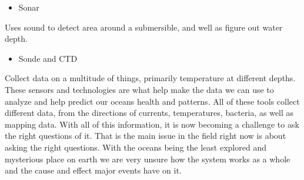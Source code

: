 \documentclass[sigconf]{acmart}
\begin{document}
\begin{itemize}
\item Sonar
\end{itemize}
Uses sound to detect area around a submersible, and well as figure out water depth.
\begin{itemize}
\item Sonde and CTD
\end{itemize}
Collect data on a multitude of things, primarily temperature at different depths.
These sensors and technologies are what help make the data we can use to analyze and help predict our oceans health and patterns.  All of these tools collect different data, from the directions of currents, temperatures, bacteria, as well as mapping data.  With all of this information, it is now becoming a challenge to ask the right questions of it.  That is the main issue in the field right now is about asking the right questions.  With the oceans being the least explored and mysterious place on earth we are very unsure how the system works as a whole and the cause and effect major events have on it. 
\end{document}
